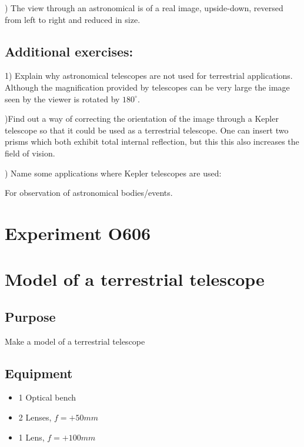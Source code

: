 \documentclass[12pt]{article}
\begin{document}
) The view through an astronomical is of a real image, upside-down, reversed from left to right and
reduced in size.

\subsection*{Additional exercises:}

1) Explain why astronomical telescopes are not used for terrestrial applications. Although the magnification provided by telescopes
can be very
 large the image seen by the viewer is rotated by $180^{\circ}$.

)Find out a way of correcting the orientation of the image through a Kepler telescope so that it could be
used as a terrestrial telescope. One can insert two prisms which both exhibit total internal reflection, but this this also increases the field of vision.

) Name some applications where Kepler telescopes are used:

For observation of astronomical bodies/events.

\newpage
\section*{Experiment O606}

\section*{Model of a terrestrial telescope}

\subsection*{Purpose}
Make a model of a terrestrial telescope

\subsection*{Equipment}
\begin{itemize}
    \item 1 Optical bench
    \item 2 Lenses, $f=+50 mm$
    \item 1 Lens, $f=+100 mm$
\end{itemize}
\end{document}
